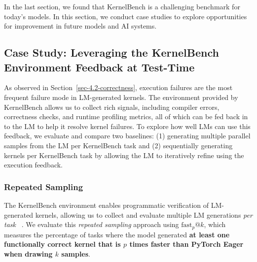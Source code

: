 \label{sec-5:analysis}
In the last section, we found that KernelBench is a challenging benchmark for today's models. In this section, we conduct case studies to explore opportunities for improvement in future models and AI systems.

\subsection{Case Study: Leveraging the KernelBench Environment Feedback at Test-Time}
As observed in Section~\ref{sec-4.2-correctness},  execution failures are the most frequent failure mode in LM-generated kernels. The environment provided by KernelBench allows us to collect rich signals, including compiler errors, correctness checks, and runtime profiling metrics, all of which can be fed back in to the LM to help it resolve kernel failures. To explore how well LMs can use this feedback, we evaluate and compare two baselines: (1) generating multiple parallel samples from the LM per KernelBench task and (2) sequentially generating kernels per KernelBench task by allowing the LM to iteratively refine using the execution feedback. 


\subsubsection{Repeated Sampling} 
The KernelBench environment enables programmatic verification of LM-generated kernels, 
allowing us to collect and evaluate multiple LM generations \textit{per task} ~\cite{brown2024largelanguagemonkeysscaling,Li_2022,grubisic2024prioritysamplinglargelanguage}. We evaluate this \textit{repeated sampling} approach using $\text{fast}_{p}@k$, which measures the percentage of tasks where the model generated \textbf{at least one functionally correct kernel that is $p$ times faster than PyTorch Eager when drawing $k$ samples}.

